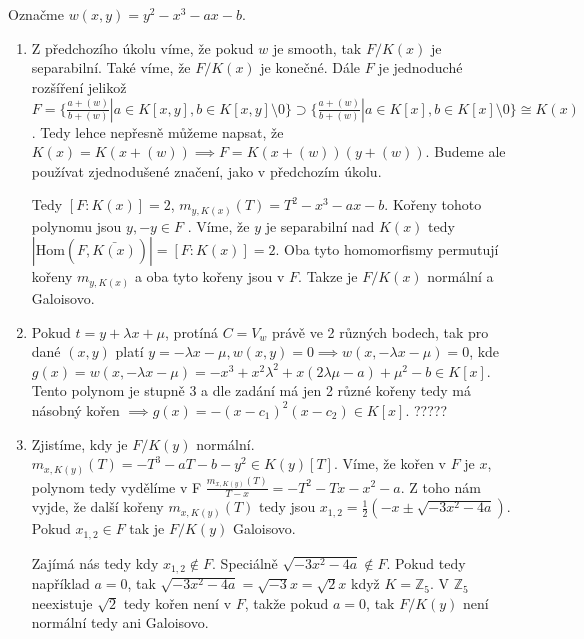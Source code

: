 \documentclass[12pt, a4paper]{article}
\begin{document}
\section{}
Označme $w(x,y)=y^2-x^3-ax-b$.
\begin{enumerate}[label=(\alph*)]
    \item Z předchozího úkolu víme, že pokud $w$ je smooth, tak $F/K(x)$ je separabilní. Také víme, že $F/K(x)$ je konečné. Dále $F$ je jednoduché rozšíření jelikož $F = \{\frac{a+(w)}{b+(w)}| a \in K[x,y], b \in K[x,y] \setminus 0 \} \supset \{\frac{a+(w)}{b+(w)}| a \in K[x], b \in K[x] \setminus 0 \} \cong K(x)$. Tedy lehce nepřesně můžeme napsat, že $K(x)=K(x+(w)) \implies F = K(x+(w))(y+(w))$. Budeme ale používat zjednodušené značení, jako v předchozím úkolu. 

    Tedy $[F:K(x)]=2$, $m_{y,K(x)}(T)=T^2 - x^3 - ax -b$. Kořeny tohoto polynomu jsou $y,-y \in F$ . Víme, že $y$ je separabilní nad $K(x)$ tedy  $|\text{Hom}(F,\bar{K(x)})|=[F:K(x)]=2$. Oba tyto homomorfismy permutují kořeny $m_{y,K(x)}$ a oba tyto kořeny jsou v $F$. Takze je $F/K(x)$ normální a Galoisovo.
    \item Pokud $t=y+\lambda x + \mu$, protíná $C=V_w$ právě ve 2 různých bodech, tak pro dané $(x,y)$ platí $y=-\lambda x - \mu, w(x,y)=0 \implies w(x,-\lambda x - \mu) = 0$, kde $g(x)=w(x,-\lambda x - \mu) = -x^3+x^2 \lambda^2 + x(2\lambda \mu -a)+\mu^2 -b \in K[x]$. Tento polynom je stupně $3$ a dle zadání má jen 2 různé kořeny tedy má násobný kořen $\implies g(x)=-(x-c_1)^2(x-c_2) \in K[x]$. ?????

    \item Zjistíme, kdy je $F/K(y)$ normální. $m_{x,K(y)}(T) = -T^3-aT-b-y^2 \in K(y)[T]$. Víme, že kořen v $F$ je $x$, polynom tedy vydělíme v F $\frac{m_{x,K(y)}(T)}{T-x} = -T^2-Tx-x^2-a$. Z toho nám vyjde, že další kořeny $m_{x,K(y)}(T)$ tedy jsou $x_{1,2} = \frac{1}{2}(-x\pm \sqrt{-3x^2-4a})$. Pokud $x_{1,2} \in F$ tak je $F/K(y)$ Galoisovo. 

    Zajímá nás tedy kdy $x_{1,2} \notin F$. Speciálně $\sqrt{-3x^2-4a} \notin F$. Pokud tedy například $a = 0$, tak $\sqrt{-3x^2-4a}=\sqrt{-3}x = \sqrt{2}x$ když $K = \mathbb{Z}_5$. V $\mathbb{Z}_5$ neexistuje $\sqrt{2}$ tedy kořen není v $F$, takže pokud $a=0$, tak $F/K(y)$ není normální tedy ani Galoisovo.
\end{enumerate}
\end{document}
